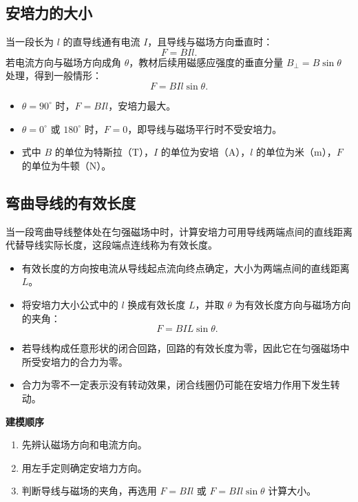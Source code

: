 \documentclass[a4paper,12pt,twoside]{article}
\begin{document}
\subsection{安培力的大小}
当一段长为 \(l\) 的直导线通有电流 \(I\)，且导线与磁场方向垂直时：
\[
    F = BIl.
\]
若电流方向与磁场方向成角 \(\theta\)，教材后续用磁感应强度的垂直分量 \(B_{\perp}=B\sin\theta\) 处理，得到一般情形：
\[
    F = BIl\sin\theta.
\]
\begin{itemize}
    \item \(\theta=90^\circ\) 时，\(F=BIl\)，安培力最大。
    \item \(\theta=0^\circ\) 或 \(180^\circ\) 时，\(F=0\)，即导线与磁场平行时不受安培力。
    \item 式中 \(B\) 的单位为特斯拉（\(\mathrm{T}\)），\(I\) 的单位为安培（\(\mathrm{A}\)），\(l\) 的单位为米（\(\mathrm{m}\)），\(F\) 的单位为牛顿（\(\mathrm{N}\)）。
\end{itemize}

\subsection{弯曲导线的有效长度}
当一段弯曲导线整体处在匀强磁场中时，计算安培力可用导线两端点间的直线距离代替导线实际长度，这段端点连线称为有效长度。
\begin{itemize}
    \item 有效长度的方向按电流从导线起点流向终点确定，大小为两端点间的直线距离 \(L\)。
    \item 将安培力大小公式中的 \(l\) 换成有效长度 \(L\)，并取 \(\theta\) 为有效长度方向与磁场方向的夹角：
          \[
              F=BIL\sin\theta.
          \]
    \item 若导线构成任意形状的闭合回路，回路的有效长度为零，因此它在匀强磁场中所受安培力的合力为零。
    \item 合力为零不一定表示没有转动效果，闭合线圈仍可能在安培力作用下发生转动。
\end{itemize}

\begin{formal}
    \noindent\textbf{建模顺序}
    \begin{enumerate}
        \item 先辨认磁场方向和电流方向。
        \item 用左手定则确定安培力方向。
        \item 判断导线与磁场的夹角，再选用 \(F=BIl\) 或 \(F=BIl\sin\theta\) 计算大小。
    \end{enumerate}
\end{formal}
\end{document}
